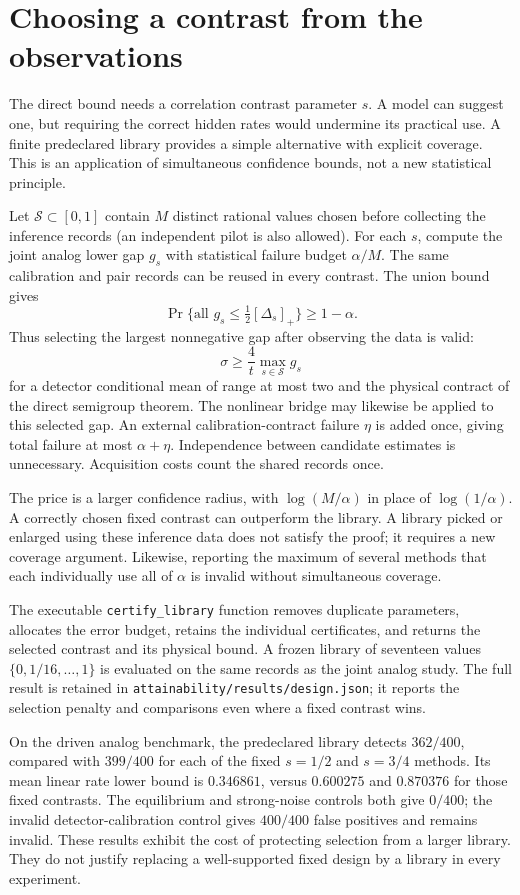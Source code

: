 \chapter{Choosing a contrast from the observations}
\label{pa:design}
The direct bound needs a correlation contrast parameter $s$. A model can suggest
one, but requiring the correct hidden rates would undermine its practical use.
A finite predeclared library provides a simple alternative with explicit coverage.
This is an application of simultaneous confidence bounds, not a new statistical
principle.

Let $\mathcal S\subset[0,1]$ contain $M$ distinct rational values chosen before
collecting the inference records (an independent pilot is also allowed).
For each $s$, compute the joint analog lower gap $g_s$ with statistical failure
budget $\alpha/M$. The same calibration and pair records can be reused in every
contrast. The union bound gives
\[
 \Pr\{\text{all }g_s\leq\tfrac12[\Delta_s]_+\}\geq1-\alpha.
\]
Thus selecting the largest nonnegative gap after observing the data is valid:
\[
 \sigma\geq \frac{4}{t}\max_{s\in\mathcal S}g_s
\]
for a detector conditional mean of range at most two and the physical contract
of the direct semigroup theorem. The nonlinear bridge may likewise be applied
to this selected gap. An external calibration-contract failure $\eta$ is added
once, giving total failure at most $\alpha+\eta$. Independence between candidate
estimates is unnecessary. Acquisition costs count the shared records once.

The price is a larger confidence radius, with $\log(M/\alpha)$ in place of
$\log(1/\alpha)$. A correctly chosen fixed contrast can outperform the library.
A library picked or enlarged using these inference data does not satisfy the
proof; it requires a new coverage argument. Likewise, reporting the maximum of
several methods that each individually use all of $\alpha$ is invalid without
simultaneous coverage.

The executable \texttt{certify\_library} function removes duplicate parameters,
allocates the error budget, retains the individual certificates, and returns the
selected contrast and its physical bound. A frozen library of seventeen values
$\{0,1/16,\ldots,1\}$ is evaluated on the same records as the joint analog study.
The full result is retained in \texttt{attainability/results/design.json}; it
reports the selection penalty and comparisons even where a fixed contrast wins.

On the driven analog benchmark, the predeclared library detects $362/400$,
compared with $399/400$ for each of the fixed $s=1/2$ and $s=3/4$ methods.
Its mean linear rate lower bound is $0.346861$, versus $0.600275$ and
$0.870376$ for those fixed contrasts. The equilibrium and strong-noise controls
both give $0/400$; the invalid detector-calibration control gives $400/400$
false positives and remains invalid. These results exhibit the cost of
protecting selection from a larger library. They do not justify replacing a
well-supported fixed design by a library in every experiment.
